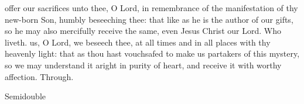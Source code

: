 \secret
{} offer our sacrifices unto thee, O Lord, in remembrance of the manifestation of thy new-born Son, humbly beseeching thee: that like as he is the author of our gifts, so he may also mercifully receive the same, even Jesus Christ our Lord. Who liveth.
\postcommunion
{} us, O Lord, we beseech thee, at all times and in all places with thy heavenly light: that as thou hast vouchsafed to make us partakers of this mystery, so we may understand it aright in purity of heart, and receive it with worthy affection. Through.

\clearpage

\label{EpiphanyII}
\begin{inhead}
{Semidouble}
\end{inhead}

\properantiphonfix

